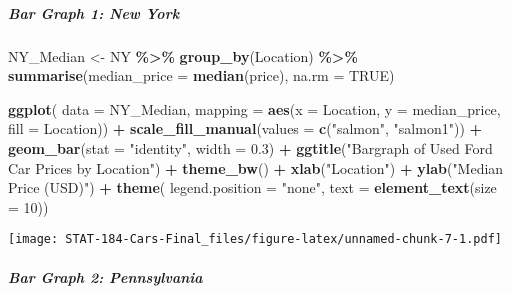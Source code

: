 \documentclass[
]{article}
\newenvironment{Shaded}{\begin{snugshade}}{\end{snugshade}}
\newcommand{\AttributeTok}[1]{\textcolor[rgb]{0.13,0.29,0.53}{#1}}
\newcommand{\ConstantTok}[1]{\textcolor[rgb]{0.56,0.35,0.01}{#1}}
\newcommand{\DecValTok}[1]{\textcolor[rgb]{0.00,0.00,0.81}{#1}}
\newcommand{\FloatTok}[1]{\textcolor[rgb]{0.00,0.00,0.81}{#1}}
\newcommand{\FunctionTok}[1]{\textcolor[rgb]{0.13,0.29,0.53}{\textbf{#1}}}
\newcommand{\NormalTok}[1]{#1}
\newcommand{\OtherTok}[1]{\textcolor[rgb]{0.56,0.35,0.01}{#1}}
\newcommand{\SpecialCharTok}[1]{\textcolor[rgb]{0.81,0.36,0.00}{\textbf{#1}}}
\newcommand{\StringTok}[1]{\textcolor[rgb]{0.31,0.60,0.02}{#1}}
\begin{document}
\hypertarget{bar-graph-1-new-york}{%
\subparagraph{Bar Graph 1: New York}\label{bar-graph-1-new-york}}

\begin{Shaded}
\begin{Highlighting}[]
\NormalTok{NY\_Median }\OtherTok{\textless{}{-}}\NormalTok{ NY }\SpecialCharTok{\%\textgreater{}\%}
  \FunctionTok{group\_by}\NormalTok{(Location) }\SpecialCharTok{\%\textgreater{}\%}
  \FunctionTok{summarise}\NormalTok{(}\AttributeTok{median\_price =} \FunctionTok{median}\NormalTok{(price), }\AttributeTok{na.rm =} \ConstantTok{TRUE}\NormalTok{)}

\FunctionTok{ggplot}\NormalTok{(}
\AttributeTok{data =}\NormalTok{ NY\_Median,}
\AttributeTok{mapping =} \FunctionTok{aes}\NormalTok{(}\AttributeTok{x =}\NormalTok{ Location, }\AttributeTok{y =}\NormalTok{ median\_price, }\AttributeTok{fill =}\NormalTok{ Location)) }\SpecialCharTok{+}
  \FunctionTok{scale\_fill\_manual}\NormalTok{(}\AttributeTok{values =} \FunctionTok{c}\NormalTok{(}\StringTok{"salmon"}\NormalTok{, }\StringTok{"salmon1"}\NormalTok{)) }\SpecialCharTok{+}
  \FunctionTok{geom\_bar}\NormalTok{(}\AttributeTok{stat =} \StringTok{"identity"}\NormalTok{, }\AttributeTok{width =} \FloatTok{0.3}\NormalTok{) }\SpecialCharTok{+}
  \FunctionTok{ggtitle}\NormalTok{(}\StringTok{"Bargraph of Used Ford Car Prices by Location"}\NormalTok{) }\SpecialCharTok{+}
  \FunctionTok{theme\_bw}\NormalTok{() }\SpecialCharTok{+}
  \FunctionTok{xlab}\NormalTok{(}\StringTok{"Location"}\NormalTok{) }\SpecialCharTok{+}
  \FunctionTok{ylab}\NormalTok{(}\StringTok{"Median Price (USD)"}\NormalTok{) }\SpecialCharTok{+}
  \FunctionTok{theme}\NormalTok{(}
  \AttributeTok{legend.position =} \StringTok{"none"}\NormalTok{,}
  \AttributeTok{text =} \FunctionTok{element\_text}\NormalTok{(}\AttributeTok{size =} \DecValTok{10}\NormalTok{))}
\end{Highlighting}
\end{Shaded}

\texttt{[image: STAT-184-Cars-Final\_files/figure-latex/unnamed-chunk-7-1.pdf]}

\hypertarget{bar-graph-2-pennsylvania}{%
\subparagraph{Bar Graph 2:
Pennsylvania}\label{bar-graph-2-pennsylvania}}
\end{document}
